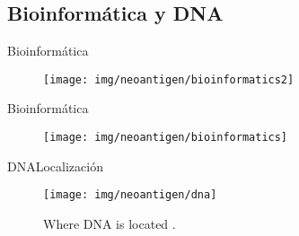 \documentclass[10pt]{beamer}
\newcommand{\1}{
	\setbeamertemplate{background}{
		\texttt{[image: img/1]}
		\tikz[overlay] \fill[fill opacity=0.75,fill=white] (0,0) rectangle (-\paperwidth,\paperheight);
	}
}
\begin{document}
\subsection{Bioinformática y DNA}

\begin{frame}{Bioinformática}{}		
	\begin{figure}
		\texttt{[image: img/neoantigen/bioinformatics2]}
		
	\end{figure}		
\end{frame}

\begin{frame}{Bioinformática}{}		
	\begin{figure}
		\texttt{[image: img/neoantigen/bioinformatics]}
		
	\end{figure}		
\end{frame}

\begin{frame}{DNA}{Localización}
	\begin{figure}[]
		\centering
		\texttt{[image: img/neoantigen/dna]}
		\label{img:mot2}
		\caption{Where DNA is located \cite{NCIdictionary2022}.}
	\end{figure}
\end{frame}
\end{document}
